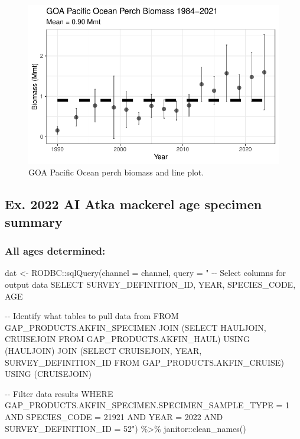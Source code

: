 \documentclass[
  letterpaper,
  oneside,
  open=any]{scrbook}
\newenvironment{Shaded}{\begin{snugshade}}{\end{snugshade}}
\newcommand{\AttributeTok}[1]{\textcolor[rgb]{0.40,0.45,0.13}{#1}}
\newcommand{\FunctionTok}[1]{\textcolor[rgb]{0.28,0.35,0.67}{#1}}
\newcommand{\NormalTok}[1]{\textcolor[rgb]{0.00,0.23,0.31}{#1}}
\newcommand{\OtherTok}[1]{\textcolor[rgb]{0.00,0.23,0.31}{#1}}
\newcommand{\SpecialCharTok}[1]{\textcolor[rgb]{0.37,0.37,0.37}{#1}}
\newcommand{\StringTok}[1]{\textcolor[rgb]{0.13,0.47,0.30}{#1}}
\begin{document}
\begin{figure}[H]

{\centering \includegraphics{content/akfin-oracle-sql-r_files/figure-pdf/test-5-fig-1.pdf}

}

\caption{GOA Pacific Ocean perch biomass and line plot.}

\end{figure}%

\subsection{Ex. 2022 AI Atka mackerel age specimen
summary}\label{ex.-2022-ai-atka-mackerel-age-specimen-summary}

\subsubsection{All ages determined:}\label{all-ages-determined}

\begin{Shaded}
\begin{Highlighting}[]
\NormalTok{dat }\OtherTok{\textless{}{-}}\NormalTok{ RODBC}\SpecialCharTok{::}\FunctionTok{sqlQuery}\NormalTok{(}\AttributeTok{channel =}\NormalTok{ channel,}
                       \AttributeTok{query =} \StringTok{"}
\StringTok{{-}{-} Select columns for output data}
\StringTok{SELECT SURVEY\_DEFINITION\_ID, YEAR, SPECIES\_CODE, AGE}

\StringTok{{-}{-} Identify what tables to pull data from}
\StringTok{FROM GAP\_PRODUCTS.AKFIN\_SPECIMEN}
\StringTok{JOIN (SELECT HAULJOIN, CRUISEJOIN FROM GAP\_PRODUCTS.AKFIN\_HAUL)}
\StringTok{USING (HAULJOIN)}
\StringTok{JOIN (SELECT CRUISEJOIN, YEAR, SURVEY\_DEFINITION\_ID FROM GAP\_PRODUCTS.AKFIN\_CRUISE)}
\StringTok{USING (CRUISEJOIN)}

\StringTok{{-}{-} Filter data results}
\StringTok{WHERE GAP\_PRODUCTS.AKFIN\_SPECIMEN.SPECIMEN\_SAMPLE\_TYPE = 1}
\StringTok{AND SPECIES\_CODE = 21921}
\StringTok{AND YEAR = 2022}
\StringTok{AND SURVEY\_DEFINITION\_ID = 52"}\NormalTok{) }\SpecialCharTok{\%\textgreater{}\%} 
\NormalTok{  janitor}\SpecialCharTok{::}\FunctionTok{clean\_names}\NormalTok{()}
\end{Highlighting}
\end{Shaded}
\end{document}
